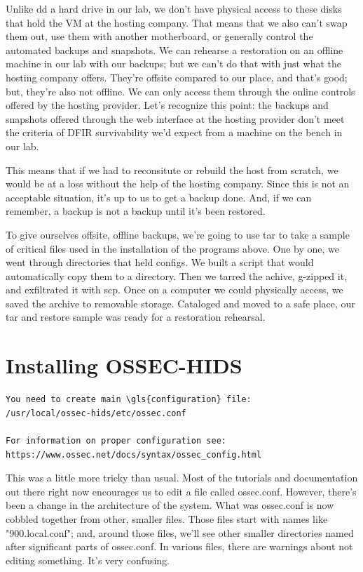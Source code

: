 Unlike dd a hard drive in our lab, we don't have physical access to these disks that hold the VM at the hosting company.  That means that we also can't swap them out, use them with another motherboard, or generally control the automated backups and snapshots.  We can rehearse a restoration on an offline machine in our lab with our backups; but we can't do that with just what the hosting company offers.  They're offsite compared to our place, and that's good; but, they're also not offline.  We can only access them through the online controls offered by the hosting provider.  Let's recognize this point:  the backups and snapshots offered through the web interface at the hosting provider don't meet the criteria of DFIR survivability we'd expect from a machine on the bench in our lab.  

This means that if we had to reconsitute or rebuild the host from scratch, we would be at a loss without the help of the hosting company.  Since this is not an acceptable situation, it's up to us to get a \gls{backup} done.  And, if we can remember, a \gls{backup} is not a backup until it's been restored.  


To give ourselves offsite, offline backups, we're going to use tar to take a sample of critical files used in the installation of the programs above.  One by one, we went through directories that held configs.  We built a script that would automatically copy them to a directory.  Then we tarred the achive, g-zipped it, and exfiltrated it with scp.  Once on a computer we could physically access, we saved the archive to removable storage.  Cataloged and moved to a safe place, our tar and restore sample was ready for a restoration rehearsal.

\section{Installing OSSEC-HIDS}

\begin{lstlisting}
You need to create main \gls{configuration} file:
/usr/local/ossec-hids/etc/ossec.conf

For information on proper configuration see:
https://www.ossec.net/docs/syntax/ossec_config.html
\end{lstlisting}

This was a little more tricky than usual.  Most of the tutorials and documentation out there right now encourages us to edit a file called ossec.conf.  However, there's been a change in the architecture of the system.  What was ossec.conf is now cobbled together from other, smaller files.  Those files start with names like "900.local.conf"; and, around those files, we'll see other smaller directories named after significant parts of ossec.conf.  In various files, there are warnings about not editing something.  It's very confusing.

